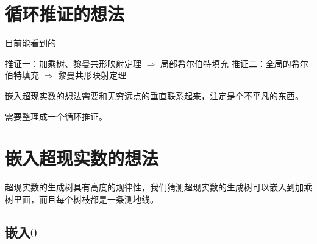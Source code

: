 \documentclass[a4paper,12pt]{article}
\begin{document}
\section{循环推证的想法}

目前能看到的

推证一：加乘树、黎曼共形映射定理 $\Rightarrow$ 局部希尔伯特填充
推证二：全局的希尔伯特填充 $\Rightarrow$ 黎曼共形映射定理

嵌入超现实数的想法需要和无穷远点的垂直联系起来，注定是个不平凡的东西。

需要整理成一个循环推证。

\newpage


\section{嵌入超现实数的想法}

超现实数的生成树具有高度的规律性，我们猜测超现实数的生成树可以嵌入到加乘树里面，而且每个树枝都是一条测地线。

\subsection{嵌入$0$}
\end{document}
